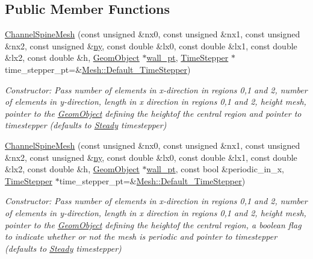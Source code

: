 \subsection*{Public Member Functions}
\begin{DoxyCompactItemize}
\item 
\hyperlink{classoomph_1_1ChannelSpineMesh_a9f8cdd0476807b44bccb7b1ae6f97a4a}{Channel\+Spine\+Mesh} (const unsigned \&nx0, const unsigned \&nx1, const unsigned \&nx2, const unsigned \&\hyperlink{classoomph_1_1RectangularQuadMesh_a86d76a55eb7c4e8bca9b74d23c8b0412}{ny}, const double \&lx0, const double \&lx1, const double \&lx2, const double \&h, \hyperlink{classoomph_1_1GeomObject}{Geom\+Object} $\ast$\hyperlink{classoomph_1_1ChannelSpineMesh_a741893ef460f1275f1df43496bb7536c}{wall\+\_\+pt}, \hyperlink{classoomph_1_1TimeStepper}{Time\+Stepper} $\ast$time\+\_\+stepper\+\_\+pt=\&\hyperlink{classoomph_1_1Mesh_a12243d0fee2b1fcee729ee5a4777ea10}{Mesh\+::\+Default\+\_\+\+Time\+Stepper})
\begin{DoxyCompactList}\small\item\em Constructor\+: Pass number of elements in x-\/direction in regions 0,1 and 2, number of elements in y-\/direction, length in x direction in regions 0,1 and 2, height mesh, pointer to the \hyperlink{classoomph_1_1GeomObject}{Geom\+Object} defining the heightof the central region and pointer to timestepper (defaults to \hyperlink{classoomph_1_1Steady}{Steady} timestepper) \end{DoxyCompactList}\item 
\hyperlink{classoomph_1_1ChannelSpineMesh_afb1b729691c03cef065d351094092406}{Channel\+Spine\+Mesh} (const unsigned \&nx0, const unsigned \&nx1, const unsigned \&nx2, const unsigned \&\hyperlink{classoomph_1_1RectangularQuadMesh_a86d76a55eb7c4e8bca9b74d23c8b0412}{ny}, const double \&lx0, const double \&lx1, const double \&lx2, const double \&h, \hyperlink{classoomph_1_1GeomObject}{Geom\+Object} $\ast$\hyperlink{classoomph_1_1ChannelSpineMesh_a741893ef460f1275f1df43496bb7536c}{wall\+\_\+pt}, const bool \&periodic\+\_\+in\+\_\+x, \hyperlink{classoomph_1_1TimeStepper}{Time\+Stepper} $\ast$time\+\_\+stepper\+\_\+pt=\&\hyperlink{classoomph_1_1Mesh_a12243d0fee2b1fcee729ee5a4777ea10}{Mesh\+::\+Default\+\_\+\+Time\+Stepper})
\begin{DoxyCompactList}\small\item\em Constructor\+: Pass number of elements in x-\/direction in regions 0,1 and 2, number of elements in y-\/direction, length in x direction in regions 0,1 and 2, height mesh, pointer to the \hyperlink{classoomph_1_1GeomObject}{Geom\+Object} defining the heightof the central region, a boolean flag to indicate whether or not the mesh is periodic and pointer to timestepper (defaults to \hyperlink{classoomph_1_1Steady}{Steady} timestepper) \end{DoxyCompactList}\item 

\end{DoxyCompactItemize}
